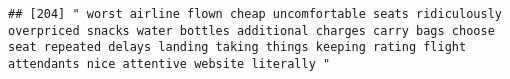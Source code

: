 \documentclass[
]{article}
\begin{document}
\begin{verbatim}
## [204] " worst airline flown cheap uncomfortable seats ridiculously overpriced snacks water bottles additional charges carry bags choose seat repeated delays landing taking things keeping rating flight attendants nice attentive website literally "                                                                                                                                                                                                                                                                                                                                                                                                                                                                                                                                                                                                                                                                                                                                                                                                                                                                                                                                                                                                                                                                                                                                                                                                                                                                                                                                                                                                                                                                                                                                                

\end{verbatim}
\end{document}
